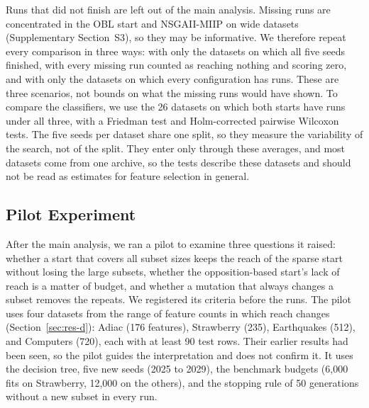 Runs that did not finish are left out of the main analysis. Missing runs are concentrated in the OBL start and NSGAII-MIIP on wide datasets (Supplementary Section~S3), so they may be informative. We therefore repeat every comparison in three ways: with only the datasets on which all five seeds finished, with every missing run counted as reaching nothing and scoring zero, and with only the datasets on which every configuration has runs. These are three scenarios, not bounds on what the missing runs would have shown. To compare the classifiers, we use the 26 datasets on which both starts have runs under all three, with a Friedman test and Holm-corrected pairwise Wilcoxon tests. The five seeds per dataset share one split, so they measure the variability of the search, not of the split. They enter only through these averages, and most datasets come from one archive, so the tests describe these datasets and should not be read as estimates for feature selection in general.

\subsection{Pilot Experiment}
\label{sec:pilot}

After the main analysis, we ran a pilot to examine three questions it raised: whether a start that covers all subset sizes keeps the reach of the sparse start without losing the large subsets, whether the opposition-based start's lack of reach is a matter of budget, and whether a mutation that always changes a subset removes the repeats. We registered its criteria before the runs. The pilot uses four datasets from the range of feature counts in which reach changes (Section~\ref{sec:res-d}): Adiac (176 features), Strawberry (235), Earthquakes (512), and Computers (720), each with at least 90 test rows. Their earlier results had been seen, so the pilot guides the interpretation and does not confirm it. It uses the decision tree, five new seeds (2025 to 2029), the benchmark budgets (6{,}000 fits on Strawberry, 12{,}000 on the others), and the stopping rule of 50 generations without a new subset in every run.

